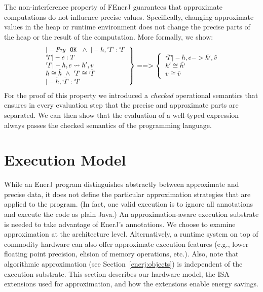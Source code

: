 
The non-interference property of FEnerJ guarantees that
approximate computations do not influence precise values. Specifically,
changing approximate values in the heap or runtime environment
does not change the precise parts of the heap or the result of the
computation.
More formally, we show:
\[
\small
\left.
\begin{array}{l}
|- \mathit{Prg}\ \ \mathtt{OK} \ \ \wedge\  |- h, \rG : \sG\\
\sG |- e : T\\
\rG |- h, e \leadsto h', v\\
h \cong \tilde{h}  \ \wedge\  \rG \cong \tilde{\rG}\\
|- \tilde{h}, \tilde{\rG} : \sG\\
\end{array}
\right\}
==>
\left\{
\begin{array}{l}
\tilde{\rG} |- \tilde{h}, e -> \tilde{h'}, \tilde{v}\\
h' \cong \tilde{h'}\\
v \cong \tilde{v}
\end{array}
\right.
\]
For the proof of this property we introduced a \emph{checked}
operational semantics that ensures in every evaluation step that the
precise and approximate parts are separated.
We can then show that the evaluation of a well-typed
expression always passes the checked semantics of the programming
language.




\section{Execution Model}
\label{enerj:sec:execution}

While an EnerJ program distinguishes abstractly between approximate and
precise data, it does not define the particular approximation strategies
that are applied to the program. (In fact, one valid execution is to ignore all
annotations and execute the code as plain Java.) An approximation-aware
execution substrate is needed to take advantage of EnerJ's annotations.
We choose to examine approximation at the architecture level.
Alternatively, a runtime system on top of commodity hardware can also
offer approximate execution features (e.g., lower floating point
precision, elision of memory operations, etc.).
Also, note that algorithmic approximation
(see Section~\ref{enerj:objects}) is independent of the
execution substrate.
This section describes our hardware model, the ISA extensions
used for approximation, and how the extensions enable energy savings.

